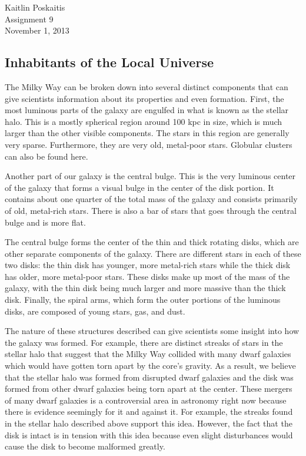 \documentclass[12pt]{article}
\begin{document}
\noindent Kaitlin Poskaitis\\
Assignment 9\\
November 1, 2013
\begin{center}
    \section*{\bf Inhabitants of the Local Universe}
\end{center}


The Milky Way can be broken down into several distinct components that can give
scientists information about its properties and even formation.  First, the
most luminous parts of the galaxy are engulfed in what is known as the stellar
halo.  This is a mostly spherical region around 100 kpc in size, which is much
larger than the other visible components.  The stars in this region are
generally very sparse.  Furthermore, they are very old, metal-poor stars.
Globular clusters can also be found here.

Another part of our galaxy is the central bulge. This is the very luminous
center of the galaxy that forms a visual bulge in the center of the disk
portion.  It contains about one quarter of the total mass of the galaxy and
consists primarily of old, metal-rich stars.  There is also a bar of stars that
goes through the central bulge and is more flat.

The central bulge forms the center of the thin
and thick rotating disks, which are other separate components of the galaxy.
There are different stars in each of these two disks: the thin disk has younger,
more metal-rich stars while the thick disk has older, more metal-poor stars.
These disks make up most of the mass of the galaxy, with the thin disk being
much larger and more massive than the thick disk.  Finally, the spiral arms,
which form the outer portions of the luminous disks,
are composed of young stars, gas, and dust.

The nature of these structures described can give scientists some insight into
how the galaxy was formed.  For example, there are distinct streaks of stars in
the stellar halo that suggest that the Milky Way collided with many dwarf
galaxies which would have gotten torn apart by the core's gravity.  As a result,
we believe that the stellar halo was formed from disrupted dwarf galaxies and
the disk was formed from other dwarf galaxies being torn apart at the center.
These mergers of many dwarf galaxies is a controversial area in astronomy right
now because there is evidence seemingly for it and against it.  For example, the
streaks found in the stellar halo described above support this idea.  However,
the fact that the disk is intact is in tension with this idea because even
slight disturbances would cause the disk to become malformed greatly.
\end{document}
